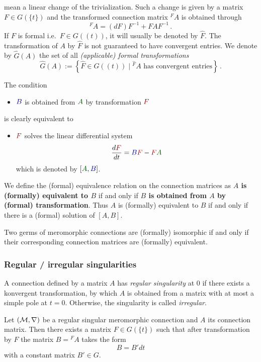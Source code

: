 mean a linear change of the trivialization.
Such a change is given by a matrix $F\in G(\!\{t\}\!)$ and the transformed
connection matrix ${}^F\!A$ is obtained through
\[
  {}^F\!A=(dF)F^{-1} + FAF^{-1} \,.
\]
If $F$ is formal i.e.\ $F\in G(\!(t)\!)$, it will usually be denoted by
$\hat F$.
The transformation of $A$ by $\hat F$ is not guaranteed to have convergent
entries.
We denote by $\hat G(A)$ the set of all \emph{(applicable) formal
transformations}
\[
  \hat G(A):=\left\{\hat F\in G(\!(t)\!)
    \mid {}^{\hat F}\!A \text{ has convergent entries}
  \right\}\,.
\]
\begin{rem}
  \def\myB{\textcolor{blue!60!black}{B}}
  \def\myA{\textcolor{green!30!black}{A}}
  \def\myF{\textcolor{red!60!black}{F}}
  The condition
  \begin{itemize}
    \item[] $\myB$ is obtained from $\myA$ by transformation $\myF$
  \end{itemize}
  is clearly equivalent to
  \begin{itemize}
    \item[]  $\myF$ solves the linear differential system
      \[
        \frac{d\myF}{dt}=\myB\myF-\myF\myA
      \]
      which is denoted by $[\myA,\myB]$.
  \end{itemize}
\end{rem}
We define the (formal) equivalence relation on the connection matrices as
\textbf{\boldmath$A$ is (formally) equivalent to $B$} if and only if
\textbf{\boldmath$B$ is obtained from $A$ by (formal) transformation}.
Thus $A$ is (formally) equivalent to $B$ if and only if there is a (formal)
solution of $[A,B]$.

\begin{defn}
  Two germs of meromorphic connections are (formally) isomorphic if and only if
  their corresponding connection matrices are (formally) equivalent.
\end{defn}

\subsubsection{Regular / irregular singularities}
\begin{defn}
  A connection defined by a matrix $A$ has \emph{regular singularity} at $0$ if
  there exists a konvergent transformation, by which $A$ is obtained from a
  matrix with at most a simple pole at $t=0$.
  Otherwise, the singularity is called \emph{irregular}.
\end{defn}
\begin{thm}
  Let $(\mathcal{M},\nabla)$ be a regular singular meromorphic connection and $A$ its
  connection matrix.
  Then there exists a matrix $F\in G(\!\{t\}\!)$ such that after transformation
  by $F$ the matrix $B={}^F\!A$ takes the form
  \[
    B=B'dt
  \]
  with a constant matrix $B'\in G$.
\end{thm}

